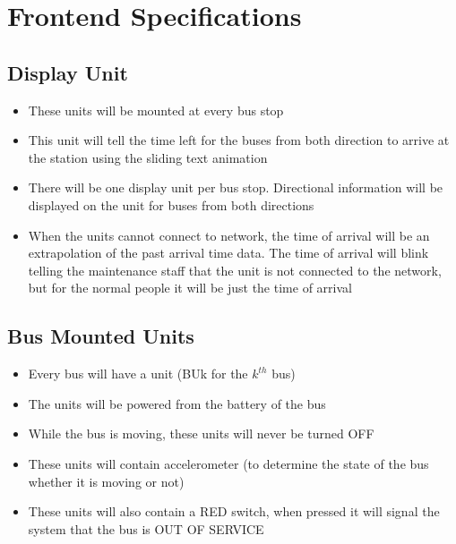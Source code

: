 \section{Frontend Specifications}
\subsection{Display Unit}
\begin{itemize}
    \item These units will be mounted at every bus stop
    \item This unit will tell the time left for the buses from both direction to arrive at the station using the sliding text animation
    \item There will be one display unit per bus stop. Directional information will be displayed on the unit for buses from both directions
    \item When the units cannot connect to network, the time of arrival will be an extrapolation of the past arrival time data. The time of arrival will blink telling the maintenance staff that the unit is not connected to the network, but for the normal people it will be just the time of arrival
\end{itemize}
\subsection{Bus Mounted Units}
\begin{itemize}
    \item Every bus will have a unit (BUk for the $k^{th}$ bus)
    \item The units will be powered from the battery of the bus 
    \item While the bus is moving, these units will never be turned OFF
    \item These units will contain accelerometer (to determine the state of the bus whether it is moving or not)
    \item These units will also contain a RED switch, when pressed it will signal the system that the bus is OUT OF SERVICE
\end{itemize}
